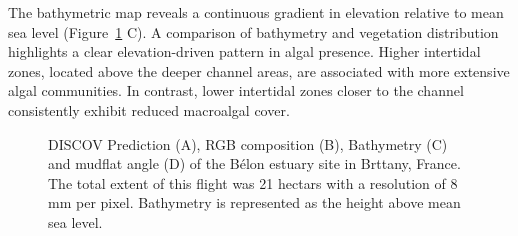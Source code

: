 \documentclass[
  letterpaper,
  DIV=11,
  numbers=noendperiod]{scrartcl}
\begin{document}
The bathymetric map reveals a continuous gradient in elevation relative
to mean sea level (Figure~\ref{fig-Belon} C). A comparison of bathymetry
and vegetation distribution highlights a clear elevation-driven pattern
in algal presence. Higher intertidal zones, located above the deeper
channel areas, are associated with more extensive algal communities. In
contrast, lower intertidal zones closer to the channel consistently
exhibit reduced macroalgal cover.

\label{cell-fig-Belon}
\begin{figure}[H]


\caption{\label{fig-Belon}DISCOV Prediction (A), RGB composition (B),
Bathymetry (C) and mudflat angle (D) of the Bélon estuary site in
Brttany, France. The total extent of this flight was 21 hectars with a
resolution of 8 mm per pixel. Bathymetry is represented as the height
above mean sea level.}

\end{figure}%
\end{document}
